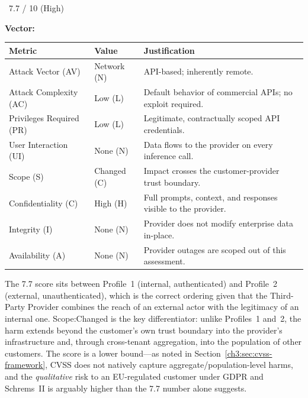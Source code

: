 \begin{cvssbox}{\badgehigh\ 7.7 / 10 (High)}
\vspace{2pt}
\begin{center}
\textbf{Vector:}\enspace
{}
\end{center}
\vspace{8pt}
\begin{tabular}{W{3.4cm}W{2.2cm}W{7.8cm}}
\toprule
  
  \small\textbf{Metric} &
  \small\textbf{Value} &
  \small\textbf{Justification} \\
  \midrule
  
  \small Attack Vector (AV)     & \small Network (N) & \small API-based; inherently remote. \\
  
  \small Attack Complexity (AC) & \small Low (L)     & \small Default behavior of commercial APIs; no exploit required. \\
  
  \small Privileges Required (PR)  & \small Low (L)  & \small Legitimate, contractually scoped API credentials. \\
  
  \small User Interaction (UI)  & \small None (N)    & \small Data flows to the provider on every inference call. \\
  
  \small Scope (S)              & \small Changed (C) & \small Impact crosses the customer-provider trust boundary. \\
  
  \small Confidentiality (C)    & \small High (H)    & \small Full prompts, context, and responses visible to the provider. \\
  
  \small Integrity (I)          & \small None (N)    & \small Provider does not modify enterprise data in-place. \\
  
  \small Availability (A)       & \small None (N)    & \small Provider outages are scoped out of this assessment. \\
  \bottomrule
\end{tabular}
\vspace{6pt}

\small The 7.7 score sits between Profile~1 (internal, authenticated) and
Profile~2 (external, unauthenticated), which is the correct ordering
given that the Third-Party Provider combines the reach of an external
actor with the legitimacy of an internal one. Scope:Changed is the key
differentiator: unlike Profiles~1 and~2, the harm extends beyond the
customer's own trust boundary into the provider's infrastructure and,
through cross-tenant aggregation, into the population of other customers.
The score is a lower bound---as noted in Section~\ref{ch3:sec:cvss-framework},
CVSS does not natively capture aggregate/population-level harms, and the
\emph{qualitative} risk to an EU-regulated customer under GDPR and
Schrems~II is arguably higher than the 7.7 number alone suggests.
\end{cvssbox}

